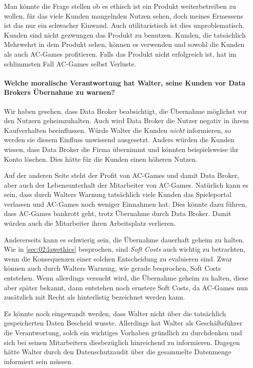 Man könnte die Frage stellen ob es ethisch ist ein Produkt weiterbetreiben zu wollen, für das viele Kunden mangelnden Nutzen sehen, doch meines Ermessens ist das nur ein schwacher Einwand. 
Auch utilitaristisch ist dies unproblematisch. Kunden sind nicht gezwungen das Produkt zu benutzen.
Kunden, die tatsächlich Mehrwehrt in dem Produkt sehen, können es verwenden und sowohl die Kunden als auch AC-Games profitieren.
Falls das Produkt nicht erfolgreich ist, hat im schlimmsten Fall AC-Games selbst Verluste.

\paragraph*{Welche moralische Verantwortung hat Walter, seine Kunden vor Data Brokers Übernahme zu warnen? \cite{kees_faites_2017}}

Wir haben gesehen, dass Data Broker beabsichtigt, die Übernahme möglichst vor den Nutzern geheimzuhalten.
Auch wird Data Broker die Nutzer negativ in ihrem Kaufverhalten beeinflussen.
Würde Walter die Kunden \emph{nicht} informieren, so werden sie diesem Einfluss unwissend ausgesetzt.
Anders würden die Kunden wissen, dass Data Broker die Firma übernimmt und könnten beispielsweise ihr Konto löschen.
Dies hätte für die Kunden einen höheren Nutzen.

Auf der anderen Seite steht der Profit von AC-Games und damit Data Broker, aber auch der Lebensunterhalt der Mitarbeiter von AC-Games.
Natürlich kann es sein, dass durch Walters Warnung tatsächlich viele Kunden das Spieleportal verlassen und AC-Games noch weniger Einnahmen hat.
Dies könnte dazu führen, dass AC-Games bankrott geht, trotz Übernahme durch Data Broker.
Damit würden auch die Mitarbeiter ihren Arbeitsplatz verlieren. 

Andererseits kann es schwierig sein, die Übernahme dauerhaft geheim zu halten.
Wie in \cref{sec:02:lawethics} besprochen, sind \emph{Soft Costs} auch wichtig zu betrachten, wenn die Konsequenzen einer solchen Entscheidung zu evaluieren sind.
Zwar können auch durch Walters Warnung, wie gerade besprochen, Soft Costs entstehen.
Wenn allerdings versucht wird, die Übernahme geheim zu halten, diese aber später bekannt, dann entstehen noch ernstere Soft Costs, da AC-Games nun zusätzlich mit Recht als hinterlistig bezeichnet werden kann.

Es könnte noch eingewandt werden, dass Walter nicht über die tatsächlich gespeicherten Daten Bescheid wusste.
Allerdings hat Walter als Geschäftsführer die Verantwortung, solch ein wichtiges Vorhaben gründlich zu durchdenken und sich bei seinen Mitarbeitern diesbezüglich hinreichend zu informieren.
Dagegen hätte Walter durch den Datenschutzaudit über die gesammelte Datenmenge informiert sein müssen.


